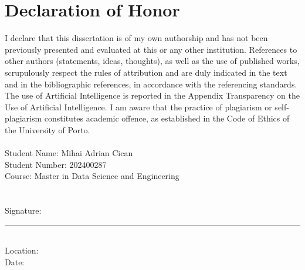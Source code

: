 \chapter*{Declaration of Honor}

I declare that this dissertation is of my own authorship and has not been previously presented and evaluated at this or any other institution. References to other authors (statements, ideas, thoughts), as well as the use of published works, scrupulously respect the rules of attribution and are duly indicated in the text and in the bibliographic references, in accordance with the referencing standards. The use of Artificial Intelligence is reported in the Appendix Transparency on the Use of Artificial Intelligence. I am aware that the practice of plagiarism or self-plagiarism constitutes academic offence, as established in the Code of Ethics of the University of Porto.\\
\\
Student Name: Mihai Adrian Cican \\ 
Student Number: 202400287 \\
Course: Master in Data Science and Engineering \\ 
\\
\\
Signature: \rule{6cm}{1pt}\\
Location: \\
Date: \\




